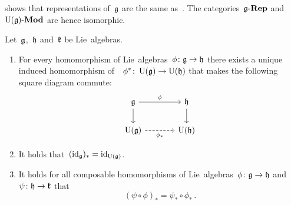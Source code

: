 \begin{remark}
   shows that representations of~$\mathfrak{g}$ are the same as~{\modules{$\Univ(\glie)$}}.
  The categories~$\mathfrak{g}\text{-}\mathbf{Rep}$ and~$\operatorname{U}(\mathfrak{g})\text{-}\mathbf{Mod}$ are hence isomorphic.
\end{remark}


\begin{lemma}
  \label{functoriality of universal enveloping algebra}
  Let~$\mathfrak{g}$,~$\mathfrak{h}$ and~$\mathfrak{k}$ be Lie~algebras.
  \begin{enumerate}
    \item
      For every homomorphism of Lie~algebras~$\phi \colon \mathfrak{g} \to \mathfrak{h}$ there exists a unique induced homomorphism of~\algebras{$\kf$}~$\phi^* \colon \operatorname{U}(\mathfrak{g}) \to \operatorname{U}(\mathfrak{h})$ that makes the following square diagram commute:
      \[
        \begin{tikzcd}[column sep = large]
          \glie
          \arrow{r}[above]{\phi}
          \arrow{d}
          &
          \hlie
          \arrow{d}
          \\
          \Univ(\glie)
          \arrow[dashed]{r}[below]{\phi_*}
          &
          \Univ(\hlie)
        \end{tikzcd}
      \]
    \item
      It holds that~$(\operatorname{id}_{\mathfrak{g}})_* = \operatorname{id}_{\operatorname{U}(\mathfrak{g})}$.
    \item
      It holds for all composable homomorphisms of Lie~algebras~$\phi \colon \mathfrak{g} \to \mathfrak{h}$ and~$\psi \colon \mathfrak{h} \to \mathfrak{k}$ that
      \[
        (\psi \circ \phi)_*
        =
        \psi_* \circ \phi_* \,.
      \]
  \end{enumerate}
\end{lemma}


